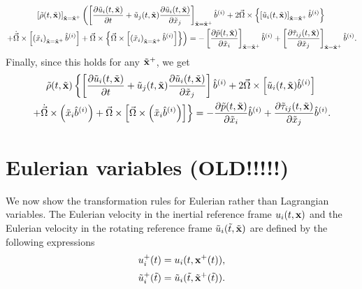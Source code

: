 \documentclass[oneside,a4paper,11pt]{report}
\begin{document}
\begin{multline}
    \left [ \tilde{\rho}(t,\tilde{\mathbf{x}}) \right]_{\tilde{\mathbf{x}} = \tilde{\mathbf{x}}^+} \left ( \left [ \frac{\partial \tilde{u}_i(t,\tilde{\mathbf{x}})}{\partial t} + \tilde{u}_j(t,\tilde{\mathbf{x}}) \frac{\partial \tilde{u}_i(t,\tilde{\mathbf{x}})}{\partial \tilde{x}_j} \right ]_{\tilde{\mathbf{x}} = \tilde{\mathbf{x}}^+} \hat{b}^{(i)} + 2 \vec{\Omega} \times \left \{ \left [\tilde{u}_i(t,\tilde{\mathbf{x}}) \right ]_{\tilde{\mathbf{x}} = \tilde{\mathbf{x}}^+} \hat{b}^{(i)} \right \} \right . \\
    \left . + \dot{\vec{\Omega}} \times \left [ \left ( \tilde{x}_i \right)_{\tilde{\mathbf{x}} = \tilde{\mathbf{x}}^+} \hat{b}^{(i)}\right ] + \vec{\Omega} \times \left \{ \vec{\Omega} \times \left [ \left ( \tilde{x}_i \right )_{\tilde{\mathbf{x}} = \tilde{\mathbf{x}}^+} \hat{b}^{(i)}\right ] \right \} \right ) = -\left [ \frac{\partial \tilde{p}(t,\tilde{\mathbf{x}})}{\partial \tilde{x}_i} \right]_{\tilde{\mathbf{x}} = \tilde{\mathbf{x}}^+} \hat{b}^{(i)} + \left [ \frac{\partial \tilde{\tau}_{ij}(t,\tilde{\mathbf{x}})}{\partial \tilde{x}_j} \right ]_{\tilde{\mathbf{x}} = \tilde{\mathbf{x}}^+} \hat{b}^{(i)}.
\end{multline}
Finally, since this holds for any $\tilde{\mathbf{x}}^+$, we get
\begin{multline}
    \tilde{\rho}(t,\tilde{\mathbf{x}}) \left \{ \left [ \frac{\partial \tilde{u}_i(t,\tilde{\mathbf{x}})}{\partial t} + \tilde{u}_j(t,\tilde{\mathbf{x}}) \frac{\partial \tilde{u}_i(t,\tilde{\mathbf{x}})}{\partial \tilde{x}_j} \right ] \hat{b}^{(i)} + 2 \vec{\Omega} \times \left [ \tilde{u}_i(t,\tilde{\mathbf{x}}) \hat{b}^{(i)} \right ] \right . \\
    \left . + \dot{\vec{\Omega}} \times \left ( \tilde{x}_i \hat{b}^{(i)}\right ) + \vec{\Omega} \times \left [ \vec{\Omega} \times \left ( \tilde{x}_i \hat{b}^{(i)} \right ) \right ] \right \} = -\frac{\partial \tilde{p}(t,\tilde{\mathbf{x}})}{\partial \tilde{x}_i} \hat{b}^{(i)} + \frac{\partial \tilde{\tau}_{ij}(t,\tilde{\mathbf{x}})}{\partial \tilde{x}_j} \hat{b}^{(i)}.
\end{multline}

\section{Eulerian variables (OLD!!!!!)}
We now show the transformation rules for Eulerian rather than Lagrangian variables. The Eulerian velocity in the inertial reference frame $u_i(t,\mathbf{x})$ and the Eulerian velocity in the rotating reference frame $\tilde{u}_i(\tilde{t}, \tilde{\mathbf{x}})$ are defined by the following expressions
\begin{equation}
    u_i^+(t) = u_i(t, \mathbf{x}^+(t)),
\end{equation}
\begin{equation}
    \tilde{u}^+_i(\tilde{t}) = \tilde{u}_i(\tilde{t},\tilde{\mathbf{x}}^+(\tilde{t})).
\end{equation}
\end{document}
